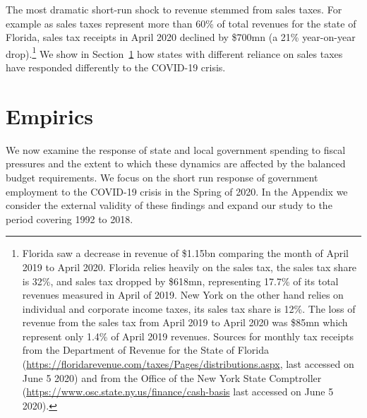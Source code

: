 The most dramatic short-run shock to revenue stemmed from sales taxes. For example as sales taxes represent more than 60\% of total revenues for the state of Florida, sales tax receipts in April 2020 declined by \$700mn (a 21\% year-on-year drop).\footnote{Florida saw a decrease in revenue of \$1.15bn comparing the month of April 2019 to April 2020. Florida relies heavily on the sales tax, the sales tax share is 32\%, and sales tax dropped by \$618mn, representing 17.7\% of its total revenues measured in April of 2019. New York on the other hand relies on individual and corporate income taxes, its sales tax share is 12\%. The loss of revenue from the sales tax from April 2019 to April 2020 was \$85mn which represent only 1.4\% of April 2019 revenues. Sources for monthly tax receipts from the Department of Revenue for the State of Florida (\url{https://floridarevenue.com/taxes/Pages/distributions.aspx}, last accessed on June 5 2020) and from the Office of the New York State Comptroller (\url{https://www.osc.state.ny.us/finance/cash-basis} last accessed on June 5 2020).}
We show in Section~\ref{sec:empirics} how states with different reliance on sales taxes have responded differently to the COVID-19 crisis. 




\section{Empirics}
\label{sec:empirics}

We now examine the response of state and local government spending to fiscal pressures and the extent to which these dynamics are affected by the balanced budget requirements. 
We focus on the short run response of government employment to the COVID-19 crisis in the Spring of 2020.
In the Appendix we consider the external validity of these findings and expand our study to the period covering 1992 to 2018.


